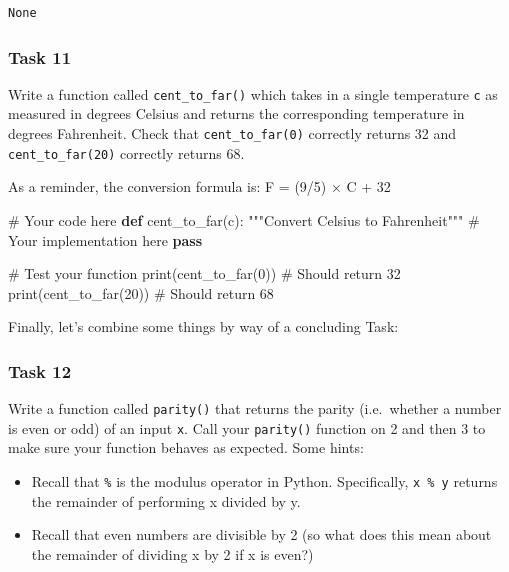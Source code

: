 \documentclass[
  11pt,
]{article}
\newenvironment{Shaded}{\begin{snugshade}}{\end{snugshade}}
\newcommand{\BuiltInTok}[1]{\textcolor[rgb]{0.00,0.23,0.31}{#1}}
\newcommand{\CommentTok}[1]{\textcolor[rgb]{0.37,0.37,0.37}{#1}}
\newcommand{\ControlFlowTok}[1]{\textcolor[rgb]{0.00,0.23,0.31}{\textbf{#1}}}
\newcommand{\DecValTok}[1]{\textcolor[rgb]{0.68,0.00,0.00}{#1}}
\newcommand{\KeywordTok}[1]{\textcolor[rgb]{0.00,0.23,0.31}{\textbf{#1}}}
\newcommand{\NormalTok}[1]{\textcolor[rgb]{0.00,0.23,0.31}{#1}}
\providecommand{\tightlist}{%
  \setlength{\itemsep}{0pt}\setlength{\parskip}{0pt}}\usepackage{longtable,booktabs,array}
\begin{document}
\begin{verbatim}
None
\end{verbatim}

\subsubsection{Task 11}\label{task-11}

Write a function called \texttt{cent\_to\_far()} which takes in a single
temperature \texttt{c} as measured in degrees Celsius and returns the
corresponding temperature in degrees Fahrenheit. Check that
\texttt{cent\_to\_far(0)} correctly returns 32 and
\texttt{cent\_to\_far(20)} correctly returns 68.

As a reminder, the conversion formula is: F = (9/5) × C + 32

\begin{Shaded}
\begin{Highlighting}[]
\CommentTok{\# Your code here}
\KeywordTok{def}\NormalTok{ cent\_to\_far(c):}
    \CommentTok{"""Convert Celsius to Fahrenheit"""}
    \CommentTok{\# Your implementation here}
    \ControlFlowTok{pass}

\CommentTok{\# Test your function}
\BuiltInTok{print}\NormalTok{(cent\_to\_far(}\DecValTok{0}\NormalTok{))   }\CommentTok{\# Should return 32}
\BuiltInTok{print}\NormalTok{(cent\_to\_far(}\DecValTok{20}\NormalTok{))  }\CommentTok{\# Should return 68}
\end{Highlighting}
\end{Shaded}

Finally, let's combine some things by way of a concluding Task:

\subsubsection{Task 12}\label{task-12}

Write a function called \texttt{parity()} that returns the parity
(i.e.~whether a number is even or odd) of an input \texttt{x}. Call your
\texttt{parity()} function on 2 and then 3 to make sure your function
behaves as expected. Some hints:

\begin{itemize}
\tightlist
\item
  Recall that \texttt{\%} is the modulus operator in Python.
  Specifically, \texttt{x\ \%\ y} returns the remainder of performing x
  divided by y.
\item
  Recall that even numbers are divisible by 2 (so what does this mean
  about the remainder of dividing x by 2 if x is even?)
\end{itemize}
\end{document}
